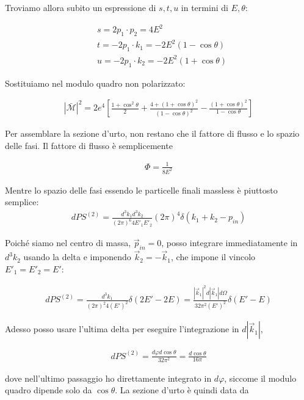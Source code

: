 \documentclass[11pt]{report}
\begin{document}
Troviamo allora subito un espressione di \(s, t, u\) in termini di \(E, \theta\): 

\begin{align}
    &s = 2p_1\cdot p_2 = 4E^2 \\
    &t = -2p_1\cdot k_1 = -2E^2(1-\cos\theta) \\
    &u = -2p_1\cdot k_2 = -2E^2(1+\cos\theta)
\end{align}

Sostituiamo nel modulo quadro non polarizzato: 

\begin{align}
    |\mathcal{\bar{M}}|^2 = 2e^4\left[\frac{1+\cos^2\theta}{2} + \frac{4+ (1+\cos\theta)^2}{(1-\cos\theta)^2} - \frac{(1+\cos\theta)^2}{1-\cos\theta}\right]
\end{align}

Per assemblare la sezione d'urto, non restano che il fattore di flusso e lo spazio delle fasi. Il fattore di flusso è semplicemente 

\begin{align}
    \Phi = \frac{1}{8E^2}
\end{align}

Mentre lo spazio delle fasi essendo le particelle finali massless è piuttosto semplice: 
\begin{align}
    dPS^{(2)} = \frac{d^3k_1 d^3k_2}{(2\pi)^6 4E'_1 E'_2}(2\pi)^4\delta(k_1 + k_2 - p_{in})
\end{align}

Poiché siamo nel centro di massa, \(\vec{p}_{in} = 0\), posso integrare immediatamente in \(d^3k_2\) usando la delta e imponendo \(\vec{k}_2 = -\vec{k}_1\), che impone il vincolo \(E'_1 = E'_2 = E'\):

\begin{align}
    dPS^{(2)} = \frac{d^3k_1}{(2\pi)^2 4(E')^2}\delta(2E' - 2E) = \frac{|\vec{k}_1|^2 d|\vec{k}_1|d\Omega}{32\pi^2 (E')^2}\delta(E'-E)
\end{align}

Adesso posso usare l'ultima delta per eseguire l'integrazione in \(d|\vec{k}_1|\), 

\begin{align}
    dPS^{(2)} = \frac{d\varphi d\cos\theta}{32\pi^2} = \frac{d\cos\theta}{16\pi}
\end{align}

dove nell'ultimo passaggio ho direttamente integrato in \(d\varphi\), siccome il modulo quadro dipende solo da \(\cos\theta\). La sezione d'urto è quindi data da 
\end{document}
